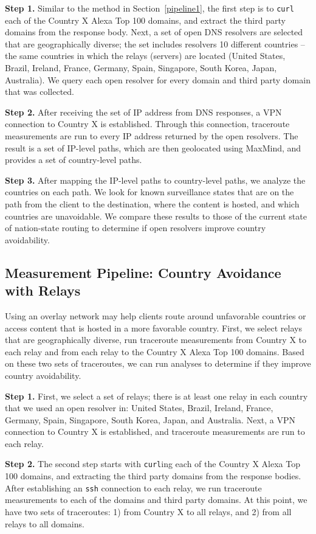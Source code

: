 {\bf Step 1.}  Similar to the method in Section~\ref{pipeline1}, the first step is to {\tt curl} each of the Country X Alexa Top 100 domains, and extract the third party domains from the response body.  Next, a set of open DNS resolvers are selected that are geographically diverse; the set includes resolvers 10 different countries -- the same countries in which the relays (servers) are located (United States, Brazil, Ireland, France, Germany, Spain, Singapore, South Korea, Japan, Australia).  We query each open resolver for every domain and third party domain that was collected.

{\bf Step 2.}  After receiving the set of IP address from DNS responses, a VPN connection to Country X is established.  Through this connection, traceroute measurements are run to every IP address returned by the open resolvers. The result is a set of IP-level paths, which are then geolocated using MaxMind, and provides a set of country-level paths.

{\bf Step 3.}  After mapping the IP-level paths to country-level paths, we analyze the countries on each path.  We look for known surveillance states that are on the path from the client to the destination, where the content is hosted, and which countries are unavoidable.  We compare these results to those of the current state of nation-state routing to determine if open resolvers improve country avoidability.

\subsection{Measurement Pipeline: Country Avoidance with Relays}
Using an overlay network may help clients route around unfavorable countries or access content that is hosted in a more favorable country.  First, we select relays that are geographically diverse, run traceroute measurements from Country X to each relay and from each relay to the Country X Alexa Top 100 domains.  Based on these two sets of traceroutes, we can run analyses to determine if they improve country avoidability.

{\bf Step 1.}  First, we select a set of relays; there is at least one relay in each country that we used an open resolver in: United States, Brazil, Ireland, France, Germany, Spain, Singapore, South Korea, Japan, and Australia.  Next, a VPN connection to Country X is established, and traceroute measurements are run to each relay.

{\bf Step 2.}  The second step starts with {\tt curl}ing each of the Country X Alexa Top 100 domains, and extracting the third party domains from the response bodies.  After establishing an {\tt ssh} connection to each relay, we run traceroute measurements to each of the domains and third party domains.  At this point, we have two sets of traceroutes: 1) from Country X to all relays, and 2) from all relays to all domains.

